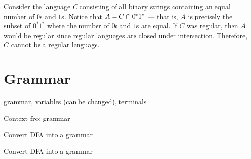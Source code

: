 \begin{exmp}
    Consider the language $C$ consisting of all binary strings containing an equal number of $0$s and $1$s. Notice that $A = C \cap 0^{*}1^{*}$ --- that is, $A$ is precisely the subset of $0^{*}1^{*}$ where the number of $0$s and $1$s are equal. If $C$ was regular, then $A$ would be regular since regular languages are closed under intersection. Therefore, $C$ cannot be a regular language.
\end{exmp}

\section{Grammar}

\begin{defn}
    grammar, variables (can be changed), terminals
\end{defn}

\begin{defn}
    Context-free grammar
\end{defn}

\begin{thm}
    Convert DFA into a grammar
\end{thm}

\begin{exmp}
    Convert DFA into a grammar
\end{exmp}
